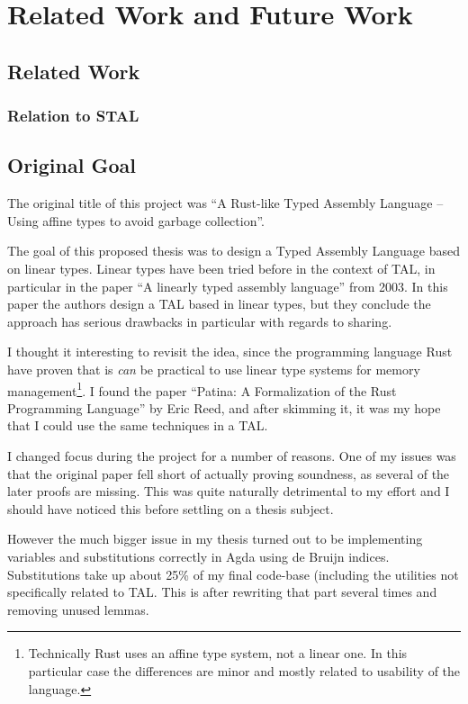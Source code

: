\chapter{Related Work and Future Work}
\label{chap:future}
\section{Related Work}
\subsection{Relation to STAL}
\label{sec:rel-stal}

\section{Original Goal}

The original title of this project was ``A Rust-like Typed Assembly Language --
Using affine types to avoid garbage collection''.

The goal of this proposed thesis was to design a Typed Assembly Language based
on linear types. Linear types have been tried before in the context of TAL, in
particular in the paper ``A linearly typed assembly language''\cite{ltal} from
2003. In this paper the authors design a TAL based in linear types, but they
conclude the approach has serious drawbacks in particular with regards to
sharing.

I thought it interesting to revisit the idea, since the programming language
Rust\cite{rust} have proven that is \emph{can} be practical to use linear type
systems for memory management\footnote{Technically Rust uses an affine type
  system, not a linear one. In this particular case the differences are minor
  and mostly related to usability of the language.}. I found the paper ``Patina:
A Formalization of the Rust Programming Language''\cite{patina} by Eric Reed,
and after skimming it, it was my hope that I could use the same techniques in a
TAL.

I changed focus during the project for a number of reasons. One of my issues was
that the original paper fell short of actually proving soundness, as several of
the later proofs are missing. This was quite naturally detrimental to my effort
and I should have noticed this before settling on a thesis subject.

However the much bigger issue in my thesis turned out to be implementing
variables and substitutions correctly in Agda using de Bruijn
indices. Substitutions take up about 25\% of my final code-base (including the
utilities not specifically related to TAL. This is after rewriting that part
several times and removing unused lemmas.

